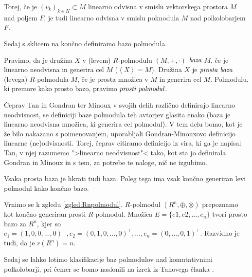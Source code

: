 \documentclass[mat1]{fmfdelo}
\newcommand{\pojem}[1]{\ensuremath{\emph{#1}}}
\newcommand{\Gen}[1]{\ensuremath{\left<{#1}\right>}}
\begin{document}
Torej, če je $(v_k)_{k\in K} \subset M$ linearno odvisna v smislu vektorskega prostora $M$ nad poljem $F$, je tudi linearno odvisna v smislu polmodula $M$ nad polkolobarjem $F$.

Sedaj s sklicem na \cite[Definicija 2.\,4.\,]{bib:Tanbase}končno definiramo bazo polmodula.

\begin{definicija}\label{def:polmodbaza}
	Pravimo, da je družina $X$ v (levem) $R$-polmodulu $(M, +, \cdot)$ \pojem{baza} $M$, če je linearno neodvisna in generira cel $M$ ($\Gen{X} = M$). Družina $X$ je \pojem{prosta baza} (levega) $R$-polmodula $M$, če je prosta množica v $M$ in generira cel $M$. Polmodulu, ki premore kako prosto bazo, pravimo \pojem{prosti polmodul}.
\end{definicija}

\begin{opomba}
Čeprav Tan in Gondran ter Minoux v svojih delih različno definirajo linearno neodvisnost, se definiciji baze polmodula teh avtorjev glasita enako (baza je linearno neodvisna množica, ki generira cel polmodul). V tem delu bomo, kot je že bilo nakazano s poimenovanjem, uporabljali Gondran-Minouxovo definicijo linearne (ne)odvisnosti. Torej, čeprav citiramo definicijo iz vira, ki ga je napisal Tan, v njej razumemo ">linearno neodvisnost"< tako, kot sta jo definirala Gondran in Minoux in s tem, za potrebe te naloge,  nič ne izgubimo.
\end{opomba}

\begin{opomba}
	Vsaka prosta baza je hkrati tudi baza. Poleg tega ima vsak končno generiran levi polmodul kako končno bazo.
\end{opomba}

\begin{zgled}
	Vrnimo se k zgledu \ref{zgled:Rnpolmodul}. $R$-polmodul $(R^n, \oplus, \otimes)$ prepoznamo kot končno generiran prosti $R$-polmodul. Množica $E = \{e1, e2, \ldots, e_n\}$ tvori prosto bazo za $R^n$, kjer so $e_1 = (1, 0, 0, \ldots, 0)^\top, e_2 = (0, 1, 0, \ldots, 0)^\top, \ldots, e_n = (0, \ldots, 0, 1)^\top$. Razvidno je tudi, da je $r(R^n) = n$.
\end{zgled}

Sedaj se lahko lotimo klasifikacije baz polmodulov nad komutativnimi polkolobarji, pri čemer se bomo naslonili na izrek iz Tanovega članka \cite[izrek 3.\ 1.]{bib:Tanbase}.
\end{document}
